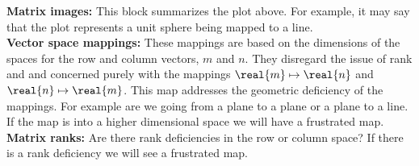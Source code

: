 \textbf{Matrix images:} This block summarizes the plot above. For example, it may say that the plot represents a unit sphere being mapped to a line.\\

\textbf{Vector space mappings:} These mappings are based on the dimensions of the spaces for the row and column vectors, $m$ and $n$. They disregard the issue of rank and and concerned purely with the mappings $\real{m}\mapsto\real{n}$ and  $\real{n}\mapsto\real{m}$. This map addresses the geometric deficiency of the mappings. For example are we going from a plane to a plane or a plane to a line. If the map is into a higher dimensional space we will have a frustrated map.\\

\textbf{Matrix ranks:} Are there rank deficiencies in the row or column space? If there is a rank deficiency we will see a frustrated map. 


\clearpage

